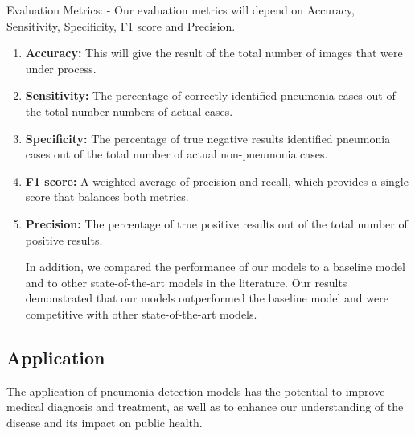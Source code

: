 Evaluation Metrics: - Our evaluation metrics will depend on Accuracy, Sensitivity, Specificity, F1 score and Precision.

\bigskip
\begin{enumerate}
	
	\item \textbf{Accuracy:} This will give the result of the total number of images that were under process.
	\item \textbf{Sensitivity:} The percentage of correctly identified pneumonia cases out of the total number numbers of actual cases.
	\item \textbf{Specificity:} The percentage of true negative results identified pneumonia cases out of the total number of actual non-pneumonia cases.
	\item \textbf{F1 score:} A weighted average of precision and recall, which provides a single score that balances both metrics.
	\item \textbf{Precision:} The percentage of true positive results out of the total number of positive results.
	
	In addition, we compared the performance of our models to a baseline model and to other state-of-the-art models in the literature. Our results demonstrated that our models outperformed the baseline model and were competitive with other state-of-the-art models.\cite{jain2022deep}
	
\end{enumerate}


\subsection{Application}

The application of pneumonia detection models has the potential to improve medical diagnosis and treatment, as well as to enhance our understanding of the disease and its impact on public health.\\

